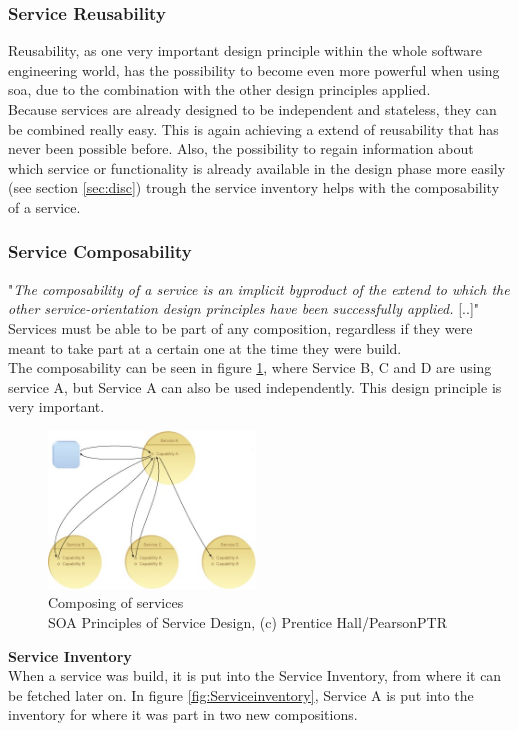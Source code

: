 \documentclass[12pt]{article}
\begin{document}
\subsubsection{Service Reusability}
Reusability, as one very important design principle within the whole software engineering world, has the possibility to become even more powerful when using \gls{soa}, due to the combination with the other design principles applied. \\  Because services are already designed to be independent and stateless, they can be combined really easy. This is again achieving a extend of reusability that has never been possible before. Also, the possibility to regain information about which service or functionality is already available in the design phase more easily (see section \ref{sec:disc}) trough the service inventory helps with the composability of a service. \cite[page 87-88]{te}
\subsubsection{Service Composability} 
"\textit{The composability of a service is an implicit byproduct of the extend to which the other service-orientation design principles have been successfully applied.} [..]"\cite[page 189]{grau}\\
Services must be able to be part of any composition, regardless if they were meant to take part at a certain one at the time they were build. \cite[page 89]{te} \\
The composability can be seen in figure \ref{fig:composserv}, where Service B, C and D are using service A, but Service A can also be used independently. This design principle is very important. 

\begin{figure}[here!]
	\centering
	\includegraphics[width=0.49\textwidth]{images/serivceorientationdotcom}
	\caption{Composing of services \cite{photos} \\ SOA Principles of Service Design, (c) Prentice Hall/PearsonPTR}
	\label{fig:composserv}
	\end{figure}
\FloatBarrier
 \noindent
\textbf{Service Inventory}\\
When a service was build, it is put into the Service Inventory, from where it can be fetched later on. In figure \ref{fig:Serviceinventory}, Service A is put into the inventory for where it was part in two new compositions. 
\end{document}

